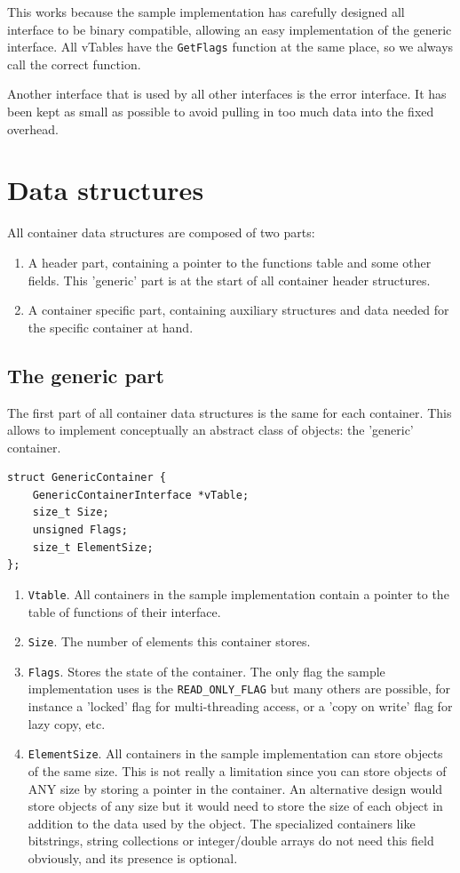 \documentclass[12pt,a4paper]{memoir} %
\begin{document}
{{This works because the sample implementation has carefully designed all interface to be binary compatible, allowing an easy implementation
of the generic interface. All vTables have the \texttt{GetFlags} function at the same place, so we always call the correct function.

Another interface that is used by all other interfaces is the error interface. It has been kept as small as possible to avoid pulling in too much
data into the fixed overhead.

\section{Data structures}
All container data structures are composed of two parts:
\begin{enumerate}
\item A header part, containing a pointer to the functions table and some other fields. This 'generic' part is at the start of all container header structures.
\item A container specific part, containing auxiliary structures and data needed for the specific container at hand.
\end{enumerate}
\subsection{The generic part}
The first part of all container data structures is the same for each container. This allows to implement conceptually an abstract class of objects: the 'generic' container.
\begin{verbatim}
struct GenericContainer {
    GenericContainerInterface *vTable;
    size_t Size;
    unsigned Flags;
    size_t ElementSize;
};
\end{verbatim}
\begin{enumerate}
\item \texttt{Vtable}. All containers in the sample implementation contain a pointer to the table of functions of their interface.
\item \texttt{Size}. The number of elements this container stores.
\item \texttt{Flags}. Stores the state of the container. The only flag the sample implementation uses is the \texttt{READ\_ONLY\_FLAG} but many others 
are possible, for instance a 'locked' flag for multi-threading access, or a 'copy on write' flag for lazy copy, etc.
\item \texttt{ElementSize}. All containers in the sample implementation can store objects of the same size. This is not really a limitation since you 
can store objects of ANY size by storing a pointer in the container.
An alternative design would store objects of any size but it would need to store the size of each object in addition to the data used by the object. 
The specialized containers like bitstrings, string collections or integer/double arrays do not need this field obviously, and its presence is optional.
\end{enumerate}
}}
\end{document}
